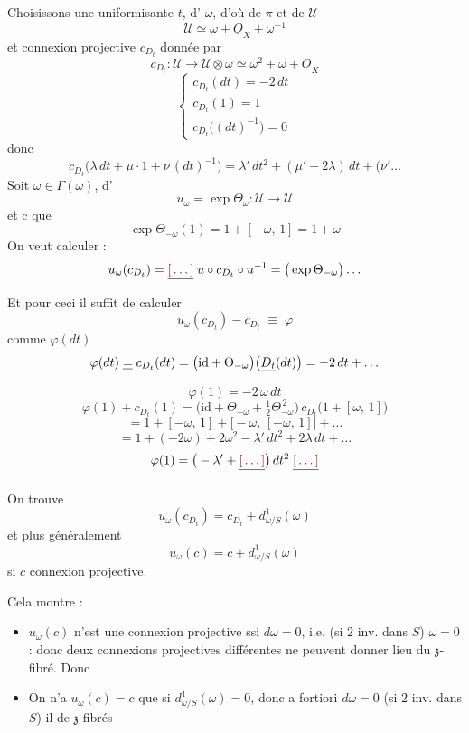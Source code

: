 \documentclass[11pt,a4paper]{article}
\begin{document}
Choisissons une uniformisante \struck{\ill{}} $t$, d'\ill{} \ill{} $\omega$,
d'où  de $\pi$ et de $\mathcal{U}$
\[
  \mathcal{U} \simeq \omega + \underline{O}_X + \omega^{-1}
\]
et connexion projective $c_{D_t}$ donnée par
\[
  c_{D_t} : \mathcal{U} \longrightarrow \mathcal{U} \otimes \omega
  \simeq \omega^2 + \omega + \underline{O}_X
\]
\[
  \begin{cases}
    c_{D_t}(dt) = -2\, dt \\
    c_{D_t}(1) = 1 \\
    c_{D_t}\big( (dt)^{-1} \big) = 0
  \end{cases}
\]
donc
\[
  c_{D_t}\big( \lambda\, dt + \mu \cdot 1 + \nu\, (dt)^{-1} \big)
  = \lambda'\, dt^2 + (\mu' - 2\lambda)\, dt + (\nu' \ldots
\]
Soit $\omega \in \Gamma(\omega)$, d'\ill{}
\[
  u_\omega = \exp \Theta_\omega : \mathcal{U} \longrightarrow \mathcal{U}
\]
et c\ill{} que
\[
  \exp \Theta_{-\omega}(1) = 1 + [-\omega,\, 1] = 1 + \omega
\]
On veut calculer :
\[
  u_\omega(c_{D_t}) = \struck{\ill{}}\; u \circ c_{D_t} \circ u^{-1}
  = \big( \exp \Theta_{-\omega} \big) \ldots
\]
Et pour ceci il suffit de calculer
\[
  u_\omega(c_{D_t}) - c_{D_t} \;\equiv\; \varphi
\]
\ill{} comme \ill{} $\varphi(dt)$ \ill{}
\[
  \varphi(dt) \;\struck{=}\; c_{D_t}(dt)
  = \big( \mathrm{id} + \Theta_{-\omega} \big)
  \big( \struck{D_t}(dt) \big) = -2\, dt + \ldots
\]
\[
  \varphi(1) = -2\,\omega\, dt
\]
\[
  \varphi(1) + c_{D_t}(1) = \Big( \mathrm{id} + \Theta_{-\omega}
  + \tfrac{1}{2} \Theta_{-\omega}^{\,2} \Big)\,
  c_{D_t}\big( 1 + [\omega,\, 1] \big)
\]
\[
  = 1 + [-\omega,\, 1] + \big[ -\omega,\, [-\omega,\, 1] \big] + \ldots
\]
\[
  = 1 + (-2\omega) + 2\omega^2 - \lambda'\, dt^2 + 2\lambda\, dt + \ldots
\]
\[
  \varphi(1) = \big( -\lambda' + \struck{\ill{}} \big)\, dt^2
  \;\struck{\ill{}}
\]

On trouve
\[
  u_\omega(c_{D_t}) = c_{D_t} + d^1_{\omega/S}(\omega)
\]
et plus généralement
\[
  \boxed{\;u_\omega(c) = c + d^1_{\omega/S}(\omega)\;}
\]
si $c$ connexion projective.

Cela montre :
\begin{itemize}
  \item[a)] $u_\omega(c)$ n'est une connexion projective \ill{} ssi
  $d\omega = 0$, i.e. (si $2$ inv. dans $S$) $\omega = 0$ : donc
    deux connexions projectives
  différentes ne peuvent donner lieu \ill{} du $\mathfrak{z}$-fibré. Donc
  \ill{}
  \item[b)] On n'a $u_\omega(c) = c$ que si $d^1_{\omega/S}(\omega) = 0$,
  donc a fortiori $d\omega = 0$ \ill{} (si $2$ inv. dans $S$) \ill{} il
  \ill{} de $\mathfrak{z}$-fibrés \ill{}
\end{itemize}
\end{document}
